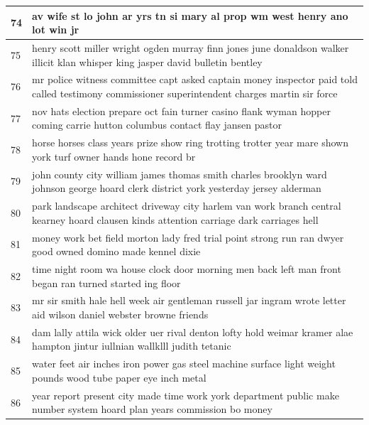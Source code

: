 \documentclass[letterpaper,11pt]{report}
\begin{document}
\begin{longtable}[c]{| p{1cm} | p{16cm} |}
74 & av wife st lo john ar yrs tn si mary al prop wm west henry ano lot win jr                                                                                        \\ \hline
75 & henry scott miller wright ogden murray finn jones june donaldson walker illicit klan whisper king jasper david bulletin bentley                                  \\ \hline
76 & mr police witness committee capt asked captain money inspector paid told called testimony commissioner superintendent charges martin sir force                   \\ \hline
77 & nov hats election prepare oct fain turner casino flank wyman hopper coming carrie hutton columbus contact flay jansen pastor                                     \\ \hline
78 & horse horses class years prize show ring trotting trotter year mare shown york turf owner hands hone record br                                                   \\ \hline
79 & john county city william james thomas smith charles brooklyn ward johnson george hoard clerk district york yesterday jersey alderman                             \\ \hline
80 & park landscape architect driveway city harlem van work branch central kearney hoard clausen kinds attention carriage dark carriages hell                         \\ \hline
81 & money work bet field morton lady fred trial point strong run ran dwyer good owned domino made kennel dixie                                                       \\ \hline
82 & time night room wa house clock door morning men back left man front began ran turned started ing floor                                                           \\ \hline
83 & mr sir smith hale hell week air gentleman russell jar ingram wrote letter aid wilson daniel webster browne friends                                               \\ \hline
84 & dam lally attila wick older uer rival denton lofty hold weimar kramer alae hampton jintur iullnian wallklll judith tetanic                                       \\ \hline
85 & water feet air inches iron power gas steel machine surface light weight pounds wood tube paper eye inch metal                                                    \\ \hline
86 & year report present city made time work york department public make number system hoard plan years commission bo money                                           \\ \hline

\end{longtable}
\end{document}
